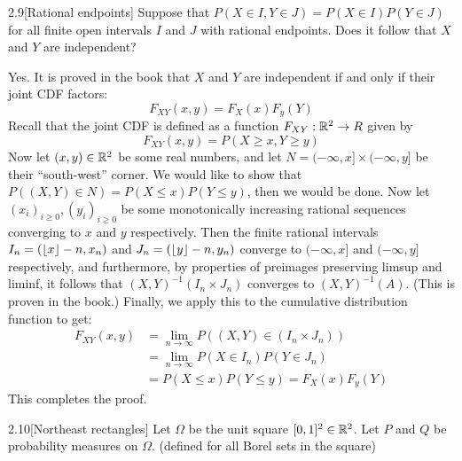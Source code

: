 \documentclass{pset}
\begin{document}
\begin{problem}{2.9}[Rational endpoints]
    Suppose that $P(X\in I, Y\in J)=P(X\in I)P(Y\in J)$ for all finite open intervals $I$ and $J$ with rational endpoints. Does it follow that $X$ and $Y$ are independent?
\end{problem}

\begin{solution}
   Yes. It is proved in the book that $X$ and $Y$ are independent if and only if their joint CDF factors:
   \[F_{XY}(x,y) = F_X(x)F_y(Y)\]
   Recall that the joint CDF is defined as a function $F_{XY} : \mathbb{R}^2 \to R$ given by 
   \[
       F_{XY}(x,y) = P(X \geq x, Y \geq y)
   \]
   Now let $(x,y)\in \mathbb{R}^2$ be some real numbers, and let $N=(-\infty, x]\times (-\infty, y]$ be their ``south-west'' corner. We would like to show that $P((X,Y)\in N) = P(X \leq x)P(Y\leq y)$, then we would be done. 
   Now let $(x_i)_{i\geq 0}, (y_i)_{i\geq 0}$ be some monotonically increasing rational sequences converging to $x$ and $y$ respectively. 
   Then the finite rational intervals $I_n = (\lfloor x\rfloor-n, x_n)$ and $J_n=(\lfloor y\rfloor-n, y_n)$ converge to $(-\infty, x]$ and $(-\infty, y]$ respectively, and furthermore, by properties of preimages preserving limsup and liminf, it follows that $(X, Y)^{-1}(I_n\times J_n)$ converges to $(X,Y)^{-1}(A)$. (This is proven in the book.) Finally, we apply this to the cumulative distribution function to get:
   \[
       \begin{aligned}
           F_{XY}(x,y) &= \lim_{n\to \infty} P((X,Y)\in (I_n\times J_n)) \\&= \lim_{n\to \infty} P(X\in I_n) P(Y\in J_n)\\ &= P(X \leq x)P(Y\leq y) = F_X(x)F_y(Y)
       \end{aligned}
   \]
   This completes the proof.
\end{solution}

\begin{problem}{2.10}[Northeast rectangles]
    Let $\Omega$ be the unit square $[0,1]^2\in\mathbb{R}^2$. Let $P$ and $Q$ be probability measures on $\Omega$. (defined for all Borel sets in the square)
\end{problem}
\end{document}

